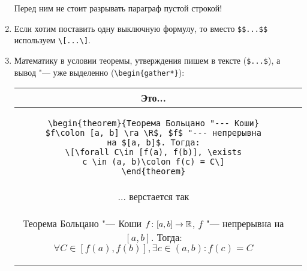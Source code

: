 \begin{enumerate}
	Перед ним не стоит разрывать параграф пустой строкой!

\item 
	Если хотим поставить одну выключную формулу, то вместо \verb!$$...$$! используем \verb!\[...\]!.

\item 
	Математику в условии теоремы, утверждения пишем в тексте (\verb'$...$'), а вывод "--- уже выделенно (\verb'\begin{gather*}'):
	\begin{center}\begin{tabular}{|c|c|}
		\hline
		Это... \\\hline
		\begin{minipage}{11.5cm}
\begin{verbatim}
\begin{theorem}{Теорема Больцано "--- Коши}
$f\colon [a, b] \ra \R$, $f$ "--- непрерывна
на $[a, b]$. Тогда:
\[\forall C\in [f(a), f(b)], \exists
c \in (a, b)\colon f(c) = C\]
\end{theorem}
\end{verbatim}
		\end{minipage} 
		\\\hline
		... верстается так \\\hline
		\begin{minipage}{11.5cm}
			\begin{theorem}{Теорема Больцано "--- Коши}
			$f\colon [a, b] \rightarrow \mathbb{R}$, $f$ "--- непрерывна на $[a, b]$. Тогда:
			\[\forall C\in [f(a), f(b)], \exists c \in (a, b)\colon f(c) = C\]
			\end{theorem}
		\end{minipage}
		\\\hline
	\end{tabular}\end{center}


\end{enumerate}
